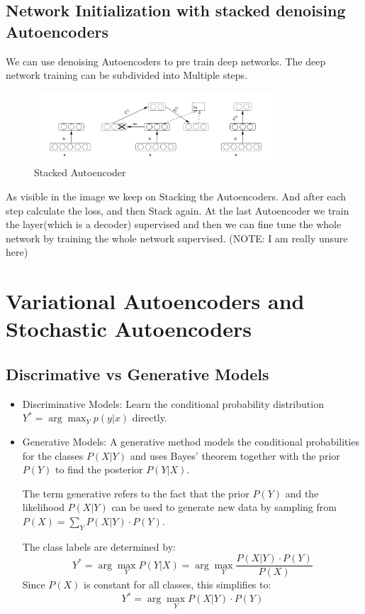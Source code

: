 \documentclass[a4paper]{article}
\begin{document}
\subsection{Network Initialization with stacked denoising Autoencoders}
We can use denoising Autoencoders to pre train deep networks. The deep network training can be subdivided into Multiple steps. 
\begin{figure}[h]
    \centering
    \includegraphics[width=0.8\textwidth]{images/stacked_autoencoders.png}
    \caption{Stacked Autoencoder}
    \label{fig:Stacked Autoencoder}
\end{figure}

As visible in the image we keep on Stacking the Autoencoders. And after each step calculate the loss, and then Stack again. 
At the last Autoencoder we train the layer(which is a decoder) supervised and then we can fine tune the whole network by training the whole network supervised. (NOTE: I am really unsure here)
\section{Variational Autoencoders and Stochastic Autoencoders}
\subsection{Discrimative vs Generative Models}
\begin{itemize}
    \item Discriminative Models: Learn the conditional probability distribution \(Y^{*} = \arg \max_{Y} p(y|x) \) directly.
    \item Generative Models: A generative method models the conditional probabilities for the classes \( P(X|Y) \) and uses Bayes' theorem together with the prior \( P(Y) \) to find the posterior \( P(Y|X) \).

    The term generative refers to the fact that the prior \( P(Y) \) and the likelihood \( P(X|Y) \) can be used to generate new data by sampling from \( P(X) = \sum_Y P(X|Y) \cdot P(Y) \).
    
    The class labels are determined by:
    \[
    Y^* = \arg\max_Y P(Y|X) = \arg\max_Y \frac{P(X|Y) \cdot P(Y)}{P(X)}
    \]
    Since \( P(X) \) is constant for all classes, this simplifies to:
    \[
    Y^* = \arg\max_Y P(X|Y) \cdot P(Y)
    \]
\end{itemize}
\end{document}
